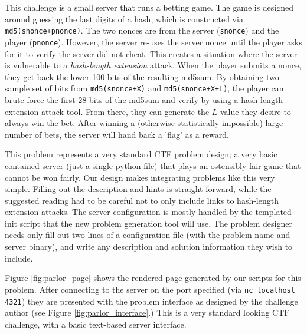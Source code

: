 This challenge is a small server that runs a betting game. The game is
designed around guessing the last digits of a hash, which is
constructed via \texttt{md5(snonce+pnonce)}. The two nonces are from
the server (\texttt{snonce}) and the player
(\texttt{pnonce}). However, the server re-uses the server nonce until
the player asks for it to verify the server did not cheat. This
creates a situation where the server is vulnerable to a
\textit{hash-length extension} attack. When the player submits a
nonce, they get back the lower 100 bits of the resulting md5sum. By
obtaining two sample set of bits from \texttt{md5(snonce+X)} and
\texttt{md5(snonce+X+L)}, the player can brute-force the first 28 bits
of the md5sum and verify by using a hash-length extension attack
tool. From there, they can generate the $L$ value they desire to
always win the bet. After winning a (otherwise statistically
impossible) large number of bets, the server will hand back a 'flag'
as a reward.

This problem represents a very standard CTF problem design; a very
basic contained server (just a single python file) that plays an
ostensibly fair game that cannot be won fairly. Our design makes
integrating problems like this very simple. Filling out the
description and hints is straight forward, while the suggested reading
had to be careful not to only include links to hash-length extension
attacks. The server configuration is mostly handled by the templated
init script that the new problem generation tool will use. The problem
designer needs only fill out two lines of a configuration file (with
the problem name and server binary), and write any description and
solution information they wish to include.

Figure \ref{fig:parlor_page} shows the rendered page generated by our
scripts for this problem. After connecting to the server on the port
specified (via \texttt{nc localhost 4321}) they are presented with the
problem interface as designed by the challenge author (see Figure
\ref{fig:parlor_interface}.) This is a very standard looking CTF
challenge, with a basic text-based server interface.

